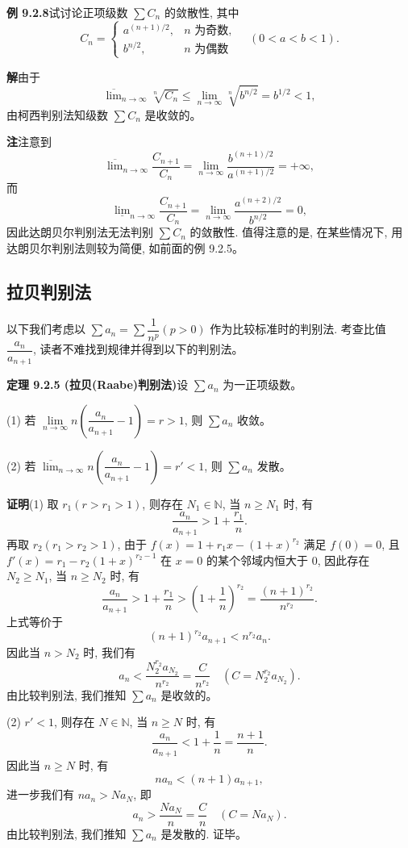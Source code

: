 \documentclass[UTF8,12pt,a4paper,fontset=fandol]{ctexart}
\begin{document}
\noindent\textbf{例 9.2.8}\quad 试讨论正项级数 $\sum C_n$ 的敛散性, 其中
\[
  C_n=\begin{cases}
    a^{(n+1)/2}, & n\text{ 为奇数},\\
    b^{n/2}, & n\text{ 为偶数}
  \end{cases}\quad(0<a<b<1).
\]

\noindent\textbf{解}\quad 由于
\[
  \overline{\lim}_{n\to\infty}\sqrt[n]{C_n}\leq\lim_{n\to\infty}\sqrt[n]{b^{n/2}}=b^{1/2}<1,
\]
由柯西判别法知级数 $\sum C_n$ 是收敛的。

\noindent\textbf{注}\quad 注意到
\[
  \overline{\lim}_{n\to\infty}\frac{C_{n+1}}{C_n}
  =\lim_{n\to\infty}\frac{b^{(n+1)/2}}{a^{(n+1)/2}}=+\infty,
\]
而
\[
  \underline{\lim}_{n\to\infty}\frac{C_{n+1}}{C_n}
  =\lim_{n\to\infty}\frac{a^{(n+2)/2}}{b^{n/2}}=0,
\]
因此达朗贝尔判别法无法判别 $\sum C_n$ 的敛散性. 值得注意的是, 在某些情况下, 用达朗贝尔判别法则较为简便, 如前面的例 9.2.5。

\subsection{拉贝判别法}

以下我们考虑以 $\sum a_n=\sum\dfrac1{n^p}(p>0)$ 作为比较标准时的判别法. 考查比值 $\dfrac{a_n}{a_{n+1}}$, 读者不难找到规律并得到以下的判别法。

\noindent\textbf{定理 9.2.5 (拉贝(Raabe)判别法)}\quad 设 $\sum a_n$ 为一正项级数。

(1) 若 $\lim\limits_{n\to\infty}n\left(\dfrac{a_n}{a_{n+1}}-1\right)=r>1$, 则 $\sum a_n$ 收敛。

(2) 若 $\overline{\lim}_{n\to\infty}n\left(\dfrac{a_n}{a_{n+1}}-1\right)=r'<1$, 则 $\sum a_n$ 发散。

\noindent\textbf{证明}\quad (1) 取 $r_1(r>r_1>1)$, 则存在 $N_1\in\mathbb{N}$, 当 $n\geq N_1$ 时, 有
\[
  \frac{a_n}{a_{n+1}}>1+\frac{r_1}{n}.
\]
再取 $r_2(r_1>r_2>1)$, 由于 $f(x)=1+r_1x-(1+x)^{r_2}$ 满足 $f(0)=0$, 且 $f'(x)=r_1-r_2(1+x)^{r_2-1}$ 在 $x=0$ 的某个邻域内恒大于 0, 因此存在 $N_2\geq N_1$, 当 $n\geq N_2$ 时, 有
\[
  \frac{a_n}{a_{n+1}}>1+\frac{r_1}{n}>\left(1+\frac1n\right)^{r_2}
  =\frac{(n+1)^{r_2}}{n^{r_2}}.
\]
上式等价于
\[
  (n+1)^{r_2}a_{n+1}<n^{r_2}a_n.
\]
因此当 $n>N_2$ 时, 我们有
\[
  a_n<\frac{N_2^{r_2}a_{N_2}}{n^{r_2}}=\frac{C}{n^{r_2}}\quad(C=N_2^{r_2}a_{N_2}).
\]
由比较判别法, 我们推知 $\sum a_n$ 是收敛的。

(2) $r'<1$, 则存在 $N\in\mathbb{N}$, 当 $n\geq N$ 时, 有
\[
  \frac{a_n}{a_{n+1}}<1+\frac1n=\frac{n+1}{n}.
\]
因此当 $n\geq N$ 时, 有
\[
  na_n<(n+1)a_{n+1},
\]
进一步我们有 $na_n>Na_N$, 即
\[
  a_n>\frac{Na_N}{n}=\frac{C}{n}\quad(C=Na_N).
\]
由比较判别法, 我们推知 $\sum a_n$ 是发散的. 证毕。
\end{document}

